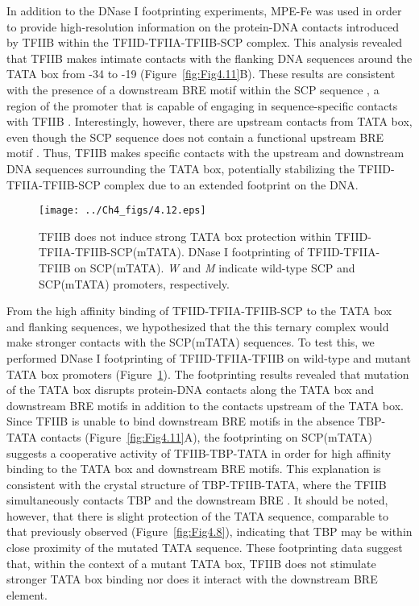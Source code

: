 \indent In addition to the DNase I footprinting experiments, MPE-Fe was used in order to provide high-resolution information on the protein-DNA contacts introduced by TFIIB within the TFIID-TFIIA-TFIIB-SCP complex. This analysis revealed that TFIIB makes intimate contacts with the flanking DNA sequences around the TATA box from -34 to -19 (Figure~\ref{fig:Fig4.11}B). These results are consistent with the presence of a downstream BRE motif within the SCP sequence \cite{Juven-Gershon_1249}, a region of the promoter that is capable of engaging in sequence-specific contacts with TFIIB \cite{Deng_2005,Tsai_2000}. Interestingly, however, there are upstream contacts from TATA box, even though the SCP sequence does not contain a functional upstream BRE motif \cite{Juven-Gershon_1249}. Thus, TFIIB makes specific contacts with the upstream and downstream DNA sequences surrounding the TATA box, potentially stabilizing the TFIID-TFIIA-TFIIB-SCP complex due to an extended footprint on the DNA. \\
\begin{figure}
\centering
\texttt{[image: ../Ch4\_figs/4.12.eps]}
\caption[TFIIB does not induce strong TATA box protection within TFIID-TFIIA-TFIIB-SCP(mTATA)]{TFIIB does not induce strong TATA box protection within TFIID-TFIIA-TFIIB-SCP(mTATA). DNase I footprinting of TFIID-TFIIA-TFIIB on SCP(mTATA). \emph{W} and \emph{M} indicate wild-type SCP and SCP(mTATA) promoters, respectively. }
\label{fig:Fig4.12}
\end{figure}
\indent From the high affinity binding of TFIID-TFIIA-TFIIB-SCP to the TATA box and flanking sequences, we hypothesized that the this ternary complex would make stronger contacts with the SCP(mTATA) sequences. To test this, we performed DNase I footprinting of TFIID-TFIIA-TFIIB on wild-type and mutant TATA box promoters (Figure~\ref{fig:Fig4.12}). The footprinting results revealed that mutation of the TATA box disrupts protein-DNA contacts along the TATA box and downstream BRE motifs in addition to the contacts upstream of the TATA box. Since TFIIB is unable to bind downstream BRE motifs in the absence TBP-TATA contacts (Figure~\ref{fig:Fig4.11}A), the footprinting on SCP(mTATA) suggests a cooperative activity of TFIIB-TBP-TATA in order for high affinity binding to the TATA box and downstream BRE motifs. This explanation is consistent with the crystal structure of TBP-TFIIB-TATA, where the TFIIB simultaneously contacts TBP and the downstream BRE \cite{Tsai_2000}. It should be noted, however, that there is slight protection of the TATA sequence, comparable to that previously observed (Figure~\ref{fig:Fig4.8}), indicating that TBP may be within close proximity of the mutated TATA sequence. These footprinting data suggest that, within the context of a mutant TATA box, TFIIB does not stimulate stronger TATA box binding nor does it interact with the downstream BRE element.\\

